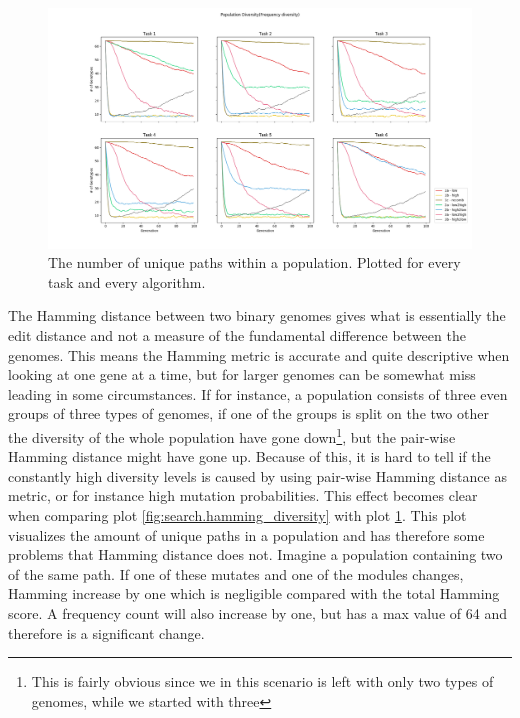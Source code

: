 \begin{figure}[h]
    \includegraphics[width=\textwidth]{Chapters/Experiments/search_algo/figures/frequency_diversity_unique_path_count.png}
    \caption{The number of unique paths within a population. Plotted for every task and every algorithm.}
    \label{fig:search.frequency_diversity_unique}
\end{figure}


The Hamming distance between two binary genomes gives what is essentially the edit distance and not a measure of the fundamental difference between the genomes. This means the Hamming metric is accurate and quite descriptive when looking at one gene at a time, but for larger genomes can be somewhat miss leading in some circumstances. If for instance, a population consists of three even groups of three types of genomes, if one of the groups is split on the two other the diversity of the whole population have gone down\footnote{This is fairly obvious since we in this scenario is left with only two types of genomes, while we started with three}, but the pair-wise Hamming distance might have gone up. Because of this, it is hard to tell if the constantly high diversity levels is caused by using pair-wise Hamming distance as metric, or for instance high mutation probabilities. This effect becomes clear when comparing plot \ref{fig:search.hamming_diversity} with plot \ref{fig:search.frequency_diversity_unique}. This plot visualizes the amount of unique paths in a population and has therefore some problems that Hamming distance does not. Imagine a population containing two of the same path. If one of these mutates and one of the modules changes, Hamming increase by one which is negligible compared with the total Hamming score. A frequency count will also increase by one, but has a max value of 64 and therefore is a significant change. 

